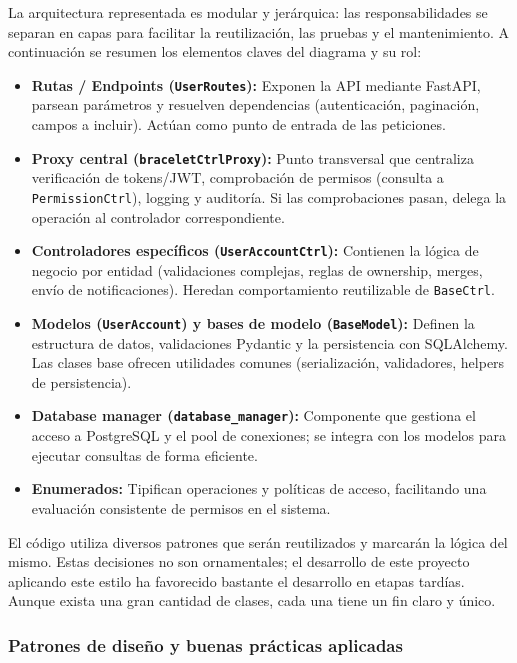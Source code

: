 \documentclass[12pt, a4paper]{article}
\begin{document}
La arquitectura representada es modular y jerárquica: las responsabilidades se separan en capas para facilitar la reutilización, las pruebas y el mantenimiento. A continuación se resumen los elementos claves del diagrama y su rol:

\begin{itemize}
	\item \textbf{Rutas / Endpoints (\texttt{UserRoutes}):} Exponen la API mediante FastAPI, parsean parámetros y resuelven dependencias (autenticación, paginación, campos a incluir). Actúan como punto de entrada de las peticiones.
	\item \textbf{Proxy central (\texttt{braceletCtrlProxy}):} Punto transversal que centraliza verificación de tokens/JWT, comprobación de permisos (consulta a \texttt{PermissionCtrl}), logging y auditoría. Si las comprobaciones pasan, delega la operación al controlador correspondiente.
	\item \textbf{Controladores específicos (\texttt{UserAccountCtrl}):} Contienen la lógica de negocio por entidad (validaciones complejas, reglas de ownership, merges, envío de notificaciones). Heredan comportamiento reutilizable de \texttt{BaseCtrl}.
	\item \textbf{Modelos (\texttt{UserAccount}) y bases de modelo (\texttt{BaseModel}):} Definen la estructura de datos, validaciones Pydantic y la persistencia con SQLAlchemy. Las clases base ofrecen utilidades comunes (serialización, validadores, helpers de persistencia).
	\item \textbf{Database manager (\texttt{database\_manager}):} Componente que gestiona el acceso a PostgreSQL y el pool de conexiones; se integra con los modelos para ejecutar consultas de forma eficiente.
	\item \textbf{Enumerados:} Tipifican operaciones y políticas de acceso, facilitando una evaluación consistente de permisos en el sistema.
\end{itemize}


El código utiliza diversos patrones que serán reutilizados y marcarán la lógica del mismo. Estas decisiones no son ornamentales; el desarrollo de este proyecto aplicando este estilo ha favorecido bastante el desarrollo en etapas tardías. Aunque exista una gran cantidad de clases, cada una tiene un fin claro y único.


\subsubsection{Patrones de diseño y buenas prácticas aplicadas}
\end{document}
